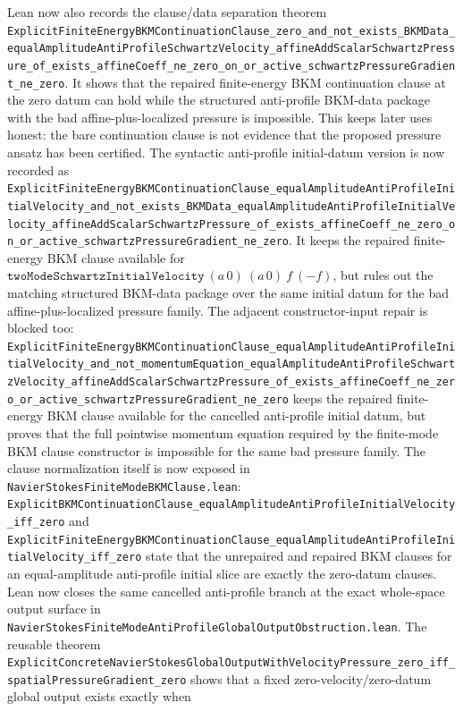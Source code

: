 \documentclass[11pt]{article}
\theoremstyle{remark}
\begin{document}
Lean now also records the clause/data separation theorem
\texttt{ExplicitFiniteEnergyBKMContinuationClause\_zero\_and\_not\_exists\_BKMData\_equalAmplitudeAntiProfileSchwartzVelocity\_affineAddScalarSchwartzPressure\_of\_exists\_affineCoeff\_ne\_zero\_on\_or\_active\_schwartzPressureGradient\_ne\_zero}.
It shows that the repaired finite-energy BKM continuation clause at the zero
datum can hold while the structured anti-profile BKM-data package with the bad
affine-plus-localized pressure is impossible.  This keeps later uses honest:
the bare continuation clause is not evidence that the proposed pressure ansatz
has been certified.
The syntactic anti-profile initial-datum version is now recorded as
\texttt{ExplicitFiniteEnergyBKMContinuationClause\_equalAmplitudeAntiProfileInitialVelocity\_and\_not\_exists\_BKMData\_equalAmplitudeAntiProfileInitialVelocity\_affineAddScalarSchwartzPressure\_of\_exists\_affineCoeff\_ne\_zero\_on\_or\_active\_schwartzPressureGradient\_ne\_zero}.
It keeps the repaired finite-energy BKM clause available for
\(\texttt{twoModeSchwartzInitialVelocity}\ (a\,0)\ (a\,0)\ f\ (-f)\), but
rules out the matching structured BKM-data package over the same initial datum
for the bad affine-plus-localized pressure family.
The adjacent constructor-input repair is blocked too:
\texttt{ExplicitFiniteEnergyBKMContinuationClause\_equalAmplitudeAntiProfileInitialVelocity\_and\_not\_momentumEquation\_equalAmplitudeAntiProfileSchwartzVelocity\_affineAddScalarSchwartzPressure\_of\_exists\_affineCoeff\_ne\_zero\_or\_active\_schwartzPressureGradient\_ne\_zero}
keeps the repaired finite-energy BKM clause available for the cancelled
anti-profile initial datum, but proves that the full pointwise momentum
equation required by the finite-mode BKM clause constructor is impossible for
the same bad pressure family.
The clause normalization itself is now exposed in
\texttt{NavierStokesFiniteModeBKMClause.lean}:
\texttt{ExplicitBKMContinuationClause\_equalAmplitudeAntiProfileInitialVelocity\_iff\_zero}
and
\texttt{ExplicitFiniteEnergyBKMContinuationClause\_equalAmplitudeAntiProfileInitialVelocity\_iff\_zero}
state that the unrepaired and repaired BKM clauses for an equal-amplitude
anti-profile initial slice are exactly the zero-datum clauses.
Lean now closes the same cancelled anti-profile branch at the exact
whole-space output surface in
\texttt{NavierStokesFiniteModeAntiProfileGlobalOutputObstruction.lean}.  The
reusable theorem
\texttt{ExplicitConcreteNavierStokesGlobalOutputWithVelocityPressure\_zero\_iff\_spatialPressureGradient\_zero}
shows that a fixed zero-velocity/zero-datum global output exists exactly when
\end{document}
